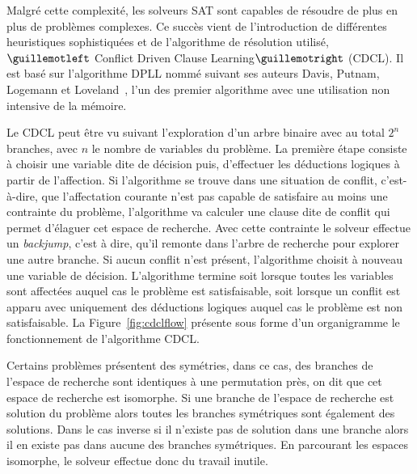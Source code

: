 Malgré cette complexité, les solveurs SAT sont capables de résoudre de plus en plus de problèmes complexes.
Ce succès vient de l'introduction de différentes heuristiques sophistiquées et de 
l'algorithme de résolution utilisé, $\guillemotleft$ Conflict Driven Clause Learning$\guillemotright$ (CDCL).
Il est basé sur l'algorithme DPLL nommé suivant ses auteurs Davis, Putnam, Logemann et Loveland~\cite{dpll_62},
l'un des premier algorithme avec une utilisation non intensive de la mémoire.

%
%
%

Le CDCL peut être vu suivant l'exploration d'un arbre binaire avec au total $2^n$ branches, avec $n$ le nombre de variables du problème.
La première étape consiste à choisir une variable dite de décision puis, d'effectuer les déductions logiques à partir de l'affection. 
Si l'algorithme se trouve dans une situation de conflit, c'est-à-dire, que l'affectation courante n'est pas capable de satisfaire au moins une contrainte du problème, l'algorithme va calculer une clause dite de conflit qui permet d'élaguer 
cet espace de recherche. Avec cette contrainte le solveur effectue un \textit{backjump}, c'est à dire, qu'il remonte dans l'arbre
de recherche pour explorer une autre branche.
Si aucun conflit n'est présent, l'algorithme choisit à nouveau une variable de décision. L'algorithme termine  soit lorsque toutes les variables sont affectées auquel cas le problème est satisfaisable, soit lorsque un conflit est apparu avec uniquement des déductions logiques auquel cas le
problème est non satisfaisable.
La Figure~\ref{fig:cdclflow} présente sous forme d'un organigramme le fonctionnement de l'algorithme CDCL.



Certains problèmes présentent des symétries, dans ce cas, des branches de l'espace de recherche 
sont identiques à une permutation près, on dit que cet espace de recherche est isomorphe.
Si une branche de l'espace de recherche est solution du problème alors toutes les branches symétriques
sont également des solutions. Dans le cas inverse si il n'existe pas de solution dans une branche alors il en
existe pas dans aucune des branches symétriques.
En parcourant les espaces isomorphe, le solveur effectue donc du travail inutile.

